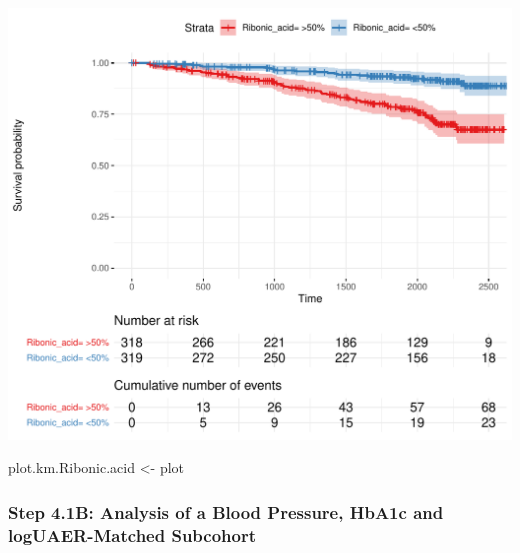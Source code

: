 \documentclass[]{article}
\newenvironment{Shaded}{\begin{snugshade}}{\end{snugshade}}
\newcommand{\NormalTok}[1]{#1}
\newcommand{\StringTok}[1]{\textcolor[rgb]{0.31,0.60,0.02}{#1}}
\begin{document}
\includegraphics{0033_PROFIL--Metabolomics_files/figure-latex/RA-Mortality-Kaplan-Maier-1.pdf}

\begin{Shaded}
\begin{Highlighting}[]
\NormalTok{plot.km.Ribonic.acid <-}\StringTok{ }\NormalTok{plot}
\end{Highlighting}
\end{Shaded}

\newpage

\hypertarget{step-4.1b-analysis-of-a-blood-pressure-hba1c-and-loguaer-matched-subcohort}{%
\subsubsection{Step 4.1B: Analysis of a Blood Pressure, HbA1c and
logUAER-Matched
Subcohort}\label{step-4.1b-analysis-of-a-blood-pressure-hba1c-and-loguaer-matched-subcohort}}
\end{document}
